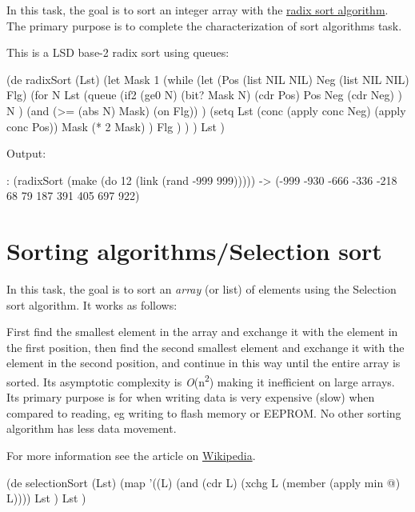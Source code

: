 \begin{itemize}
In this task, the goal is to sort an integer array with the
\href{http://en.wikipedia.org/wiki/Radix\_sort}{radix sort algorithm}.
The primary purpose is to complete the characterization of sort
algorithms task.

\begin{wideverbatim}

This is a LSD base-2 radix sort using queues:

(de radixSort (Lst)
   (let Mask 1
      (while
         (let (Pos (list NIL NIL)  Neg (list NIL NIL)  Flg)
            (for N Lst
               (queue
                  (if2 (ge0 N) (bit? Mask N)
                     (cdr Pos) Pos Neg (cdr Neg) )
                  N )
               (and (>= (abs N) Mask) (on Flg)) )
            (setq
               Lst (conc (apply conc Neg) (apply conc Pos))
               Mask (* 2 Mask) )
            Flg ) ) )
   Lst )

Output:

: (radixSort (make (do 12 (link (rand -999 999)))))
-> (-999 -930 -666 -336 -218 68 79 187 391 405 697 922)

\end{wideverbatim}

\pagebreak{}
\section*{Sorting algorithms/Selection sort}

In this task, the goal is to sort an \emph{array} (or list)
of elements using the Selection sort algorithm. It works as follows:

First find the smallest element in the array and exchange it with the
element in the first position, then find the second smallest element and
exchange it with the element in the second position, and continue in
this way until the entire array is sorted. Its asymptotic complexity is
\emph{O}(n\textsuperscript{2}) making it inefficient on large
arrays. Its primary purpose is for when writing data is very expensive
(slow) when compared to reading, eg writing to flash memory or EEPROM.
No other sorting algorithm has less data movement.

For more information see the article on
\href{http://en.wikipedia.org/wiki/Selection\_sort}{Wikipedia}.

\begin{wideverbatim}

(de selectionSort (Lst)
   (map
      '((L) (and (cdr L) (xchg L (member (apply min @) L))))
      Lst )
   Lst )


\end{wideverbatim}
\end{itemize}
